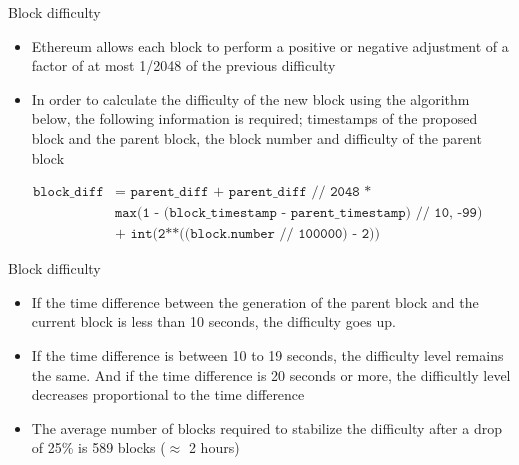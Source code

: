 \documentclass[10pt]{beamer}
\begin{document}
\begin{frame}{Block difficulty}
	\begin{itemize}
		\item Ethereum allows each block to perform a positive or negative adjustment of a factor of at most 1/2048 of the previous difficulty
		\item In order to calculate the difficulty of the new block using the algorithm below, the following information is required; timestamps of the proposed block and the parent block, the block number and difficulty of the parent block
	\end{itemize}
	\begin{centering}
		\begin{footnotesize}
			\begin{align*}
				 \texttt{block\_diff} & \texttt{= parent\_diff + parent\_diff // 2048 * }\\
				 &   \texttt{max(1 - (block\_timestamp - parent\_timestamp) // 10, -99) }\\
				 &   \texttt{+ int(2**((block.number // 100000) - 2))}
			\end{align*}
		\end{footnotesize}
	\end{centering}
\end{frame}


\begin{frame}{Block difficulty}
	\begin{itemize}
		\item If the time difference between the generation of the parent block and the current block is less than 10 seconds, the difficulty goes up.
		\item If the time difference is between 10 to 19 seconds, the difficulty level remains the same. And if the time difference is 20 seconds or more, the difficultly level decreases proportional to the time difference
		\item The average number of blocks required to stabilize the difficulty after a drop of 25\% is 589 blocks ($\approx$ 2 hours)
	\end{itemize}
\end{frame}

\end{document}
